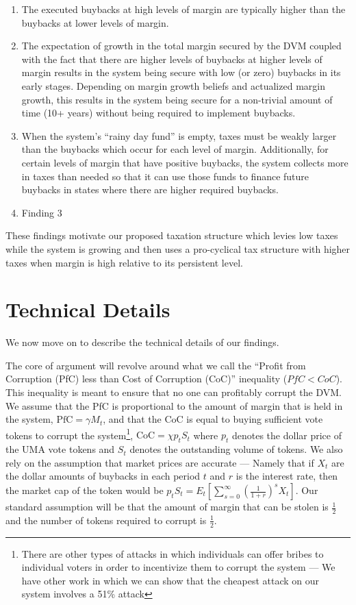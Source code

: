 \documentclass[12pt]{article}
\begin{document}
  \begin{enumerate}
    \item The executed buybacks at high levels of margin are typically higher than the buybacks at
          lower levels of margin.
    \item The expectation of growth in the total margin secured by the DVM coupled with the fact
          that there are higher levels of buybacks at higher levels of margin results in the system
          being secure with low (or zero) buybacks in its early stages. Depending on margin growth
          beliefs and actualized margin growth, this results in the system being secure for a
          non-trivial amount of time (10+ years) without being required to implement buybacks.
    \item When the system's ``rainy day fund'' is empty, taxes must be weakly larger than the
          buybacks which occur for each level of margin. Additionally, for certain levels of margin
          that have positive buybacks, the system collects more in taxes than needed so that it can
          use those funds to finance future buybacks in states where there are higher required
          buybacks.
    \item Finding 3
  \end{enumerate}

  These findings motivate our proposed taxation structure which levies low taxes while the system
  is growing and then uses a pro-cyclical tax structure with higher taxes when margin is high
  relative to its persistent level.

  \clearpage
  \newpage

\section{Technical Details}

  We now move on to describe the technical details of our findings.

  The core of argument will revolve around what we call the ``Profit from Corruption (PfC) less than
  Cost of Corruption (CoC)'' inequality ($PfC < CoC$). This inequality is meant to ensure that no
  one can profitably corrupt the DVM. We assume that the PfC is proportional to the amount of margin
  that is held in the system, $\text{PfC} = \gamma M_t$, and that the CoC is equal to buying
  sufficient vote tokens to corrupt the system\footnote{There are other types of attacks in which
  individuals can offer bribes to individual voters in order to incentivize them to corrupt the
  system --- We have other work in which we can show that the cheapest attack on our system involves
  a 51\% attack}, $\text{CoC} = \chi p_t S_t$ where $p_t$ denotes the dollar price of the UMA vote
  tokens and $S_t$ denotes the outstanding volume of tokens. We also rely on the assumption that
  market prices are accurate --- Namely that if $X_t$ are the dollar amounts of buybacks in each
  period $t$ and $r$ is the interest rate, then the market cap of the token would be
  $p_t S_t = E_t \left[ \sum_{s=0}^{\infty} \left(\frac{1}{1 + r}\right)^s X_t \right]$. Our
  standard assumption will be that the amount of margin that can be stolen is $\frac{1}{2}$ and the
  number of tokens required to corrupt is $\frac{1}{2}$.
\end{document}
